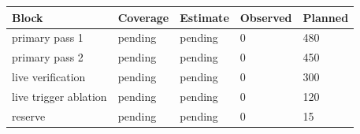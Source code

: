 \begin{tabular}{lllll}
Block & Coverage & Estimate & Observed & Planned \\
\hline
primary pass 1 & pending & pending & 0 & 480 \\
primary pass 2 & pending & pending & 0 & 450 \\
live verification & pending & pending & 0 & 300 \\
live trigger ablation & pending & pending & 0 & 120 \\
reserve & pending & pending & 0 & 15 \\
\end{tabular}
